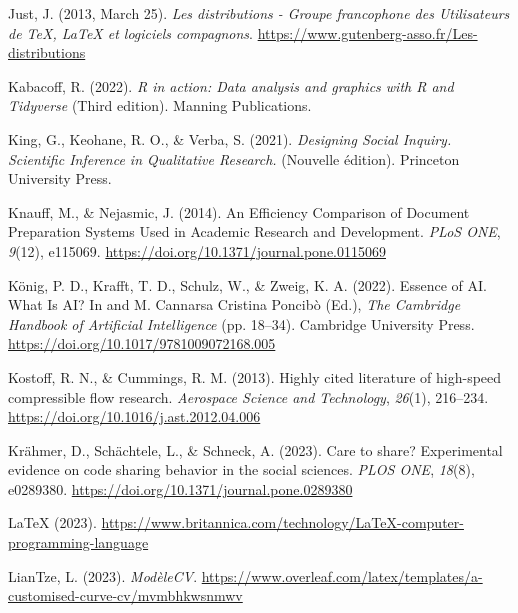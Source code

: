 \documentclass[
  letterpaper,
  DIV=11,
  numbers=noendperiod]{scrreprt}
\newlength{\cslhangindent}
\newlength{\cslentryspacingunit} %
\newenvironment{CSLReferences}[2] %
 {%
  \setlength{\parindent}{0pt}
  \ifodd #1
  \let\oldpar\par
  \def\par{\hangindent=\cslhangindent\oldpar}
  \fi
  \setlength{\parskip}{#2\cslentryspacingunit}
 }%
 {}
\begin{document}
\begin{CSLReferences}{1}{0}
\leavevmode{}%
Just, J. (2013, March 25). \emph{Les distributions - {Groupe}
francophone des {Utilisateurs} de {TeX}, {LaTeX} et logiciels
compagnons}. \url{https://www.gutenberg-asso.fr/Les-distributions}

\leavevmode{}%
Kabacoff, R. (2022). \emph{R in action: Data analysis and graphics with
{R} and {Tidyverse}} (Third edition). Manning Publications.

\leavevmode{}%
King, G., Keohane, R. O., \& Verba, S. (2021). \emph{Designing {Social
Inquiry}. {Scientific Inference} in {Qualitative Research}.} (Nouvelle
édition). Princeton University Press.

\leavevmode{}%
Knauff, M., \& Nejasmic, J. (2014). An {Efficiency Comparison} of
{Document Preparation Systems Used} in {Academic Research} and
{Development}. \emph{PLoS ONE}, \emph{9}(12), e115069.
\url{https://doi.org/10.1371/journal.pone.0115069}

\leavevmode{}%
König, P. D., Krafft, T. D., Schulz, W., \& Zweig, K. A. (2022). Essence
of {AI}. {What Is AI}? In and M. Cannarsa Cristina Poncibò (Ed.),
\emph{The {Cambridge Handbook} of {Artificial Intelligence}} (pp.
18--34). Cambridge University Press.
\url{https://doi.org/10.1017/9781009072168.005}

\leavevmode{}%
Kostoff, R. N., \& Cummings, R. M. (2013). Highly cited literature of
high-speed compressible flow research. \emph{Aerospace Science and
Technology}, \emph{26}(1), 216--234.
\url{https://doi.org/10.1016/j.ast.2012.04.006}

\leavevmode{}%
Krähmer, D., Schächtele, L., \& Schneck, A. (2023). Care to share?
{Experimental} evidence on code sharing behavior in the social sciences.
\emph{PLOS ONE}, \emph{18}(8), e0289380.
\url{https://doi.org/10.1371/journal.pone.0289380}

\leavevmode{}%
{LaTeX} (2023).
\url{https://www.britannica.com/technology/LaTeX-computer-programming-language}

\leavevmode{}%
LianTze, L. (2023). \emph{{ModèleCV}}.
\url{https://www.overleaf.com/latex/templates/a-customised-curve-cv/mvmbhkwsnmwv}


\end{CSLReferences}
\end{document}
